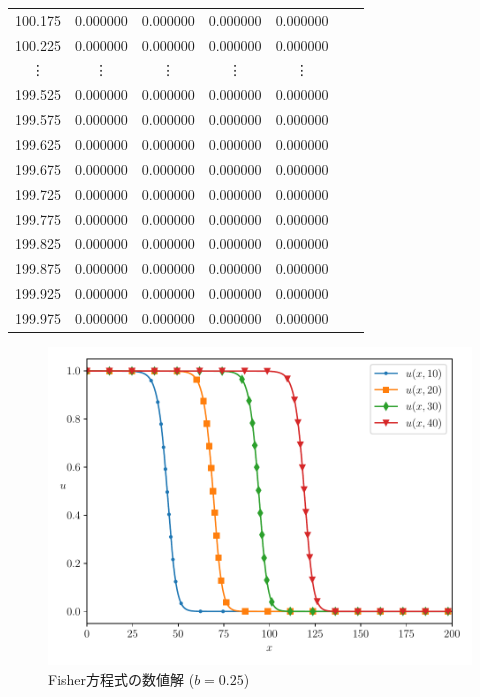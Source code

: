 \documentclass[a4j, titlepage]{jsarticle}
\numberwithin{equation}{section}
\begin{document}
\begin{table}[h]
\begin{tabular}{ccccccc}
                    100.175 & 0.000000 & 0.000000 & 0.000000 & 0.000000 \\
                    100.225 & 0.000000 & 0.000000 & 0.000000 & 0.000000 \\
                    \vdots & \vdots & \vdots & \vdots & \vdots \vspace{1mm} \\
                    199.525 & 0.000000 & 0.000000 & 0.000000 & 0.000000 \\
                    199.575 & 0.000000 & 0.000000 & 0.000000 & 0.000000 \\
                    199.625 & 0.000000 & 0.000000 & 0.000000 & 0.000000 \\
                    199.675 & 0.000000 & 0.000000 & 0.000000 & 0.000000 \\
                    199.725 & 0.000000 & 0.000000 & 0.000000 & 0.000000 \\
                    199.775 & 0.000000 & 0.000000 & 0.000000 & 0.000000 \\
                    199.825 & 0.000000 & 0.000000 & 0.000000 & 0.000000 \\
                    199.875 & 0.000000 & 0.000000 & 0.000000 & 0.000000 \\
                    199.925 & 0.000000 & 0.000000 & 0.000000 & 0.000000 \\
                    199.975 & 0.000000 & 0.000000 & 0.000000 & 0.000000 \\
                    \hline																	
                \end{tabular}
            \end{table}
            \begin{figure}[h]
                \centering
                \includegraphics[width=0.8\hsize]{kadai2/25.pdf}
                \caption{Fisher方程式の数値解 ($b = 0.25$)}
                \label{fig:fisher25}
            \end{figure}
\end{document}
